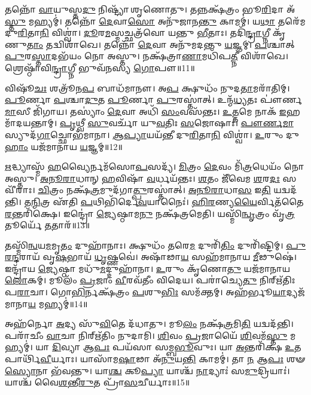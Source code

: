 𑌤𑌨𑍍𑌨𑍋᳴ \ul{𑌵𑌾}\-𑌯𑍁𑌸𑍍𑌤\-\ul{𑌦𑍁} 𑌨𑌿𑌷𑍍𑌟𑍍𑌯𑌾᳴ 𑌶𑍃𑌣𑍋𑌤𑍁।
𑌤𑌨𑍍𑌨𑌕𑍍𑌷᳴𑌤𑍍𑌰𑌂 𑌭𑍂\-\ul{𑌰𑌿}\-𑌦𑌾 𑌅᳴\-\ul{𑌸𑍍𑌤𑍁} 𑌮𑌹𑍍𑌯𑌮𑍍॑।
𑌤𑌨𑍍𑌨𑍋᳴ \ul{𑌦𑍇}\-𑌵𑌾\-\ul{𑌸𑍋} 𑌅𑌨𑍁᳴𑌜𑌾𑌨\-\ul{𑌨𑍍𑌤𑍁} 𑌕𑌾𑌮𑌮𑍍॑।
𑌯\-\ul{𑌥𑌾} 𑌤𑌰𑍇᳴𑌮 𑌦𑍁\-\ul{𑌰𑌿}\-𑌤𑌾\-\ul{𑌨𑌿} 𑌵𑌿𑌶𑍍𑌵𑌾॑।
\-\ul{𑌦𑍂}\-𑌰\-\ul{𑌮}\-𑌸𑍍𑌮𑌚𑍍𑌛𑌤𑍍𑌰᳴𑌵𑍋 𑌯𑌨𑍍𑌤𑍁 \ul{𑌭𑍀}\-𑌤𑌾𑌃।
𑌤𑌦𑌿᳴\-\ul{𑌨𑍍𑌦𑍍𑌰𑌾}\-𑌗𑍍𑌨𑍀 𑌕𑍃᳴𑌣𑍁\-\ul{𑌤𑌾𑌂} 𑌤𑌦𑍍𑌵𑌿𑌶𑌾᳴𑌖𑍇।
𑌤𑌨𑍍𑌨𑍋᳴ \ul{𑌦𑍇}\-𑌵𑌾 𑌅𑌨𑍁᳴𑌮𑌦𑌨𑍍𑌤𑍁 \ul{𑌯}\-𑌜𑍍𑌞𑌮𑍍।
\-\ul{𑌪}\-𑌶𑍍𑌚𑌾𑌤𑍍 \ul{𑌪𑍁}\-𑌰\-\ul{𑌸𑍍𑌤𑌾}\-𑌦𑌭᳴𑌯𑌂 𑌨𑍋 𑌅𑌸𑍍𑌤𑍁।
𑌨𑌕𑍍𑌷᳴𑌤𑍍𑌰𑌾\-\ul{𑌣𑌾}\-𑌮𑌧𑌿᳴𑌪\-\ul{𑌤𑍍𑌨𑍀} 𑌵𑌿𑌶𑌾᳴𑌖𑍇।
𑌶𑍍𑌰𑍇𑌷𑍍𑌠𑌾᳴𑌵𑌿\-\ul{𑌨𑍍𑌦𑍍𑌰𑌾}\-𑌗𑍍𑌨𑍀 𑌭𑍁𑌵᳴𑌨𑌸𑍍𑌯 \ul{𑌗𑍋}\-𑌪𑍗॥11॥

𑌵𑌿𑌷𑍂᳴\-\ul{𑌚𑌃} 𑌶𑌤𑍍𑌰𑍂᳴𑌨\-\ul{𑌪} 𑌬𑌾𑌧᳴𑌮𑌾𑌨𑍗।
𑌅\-\ul{𑌪} 𑌕𑍍𑌷𑍁𑌧𑌂᳴ 𑌨𑍁𑌦\-\ul{𑌤𑌾}\-𑌮𑌰𑌾᳴𑌤𑌿𑌮𑍍।
\-\ul{𑌪𑍂}\-𑌰𑍍𑌣𑌾 \ul{𑌪}\-𑌶𑍍𑌚𑌾\-\ul{𑌦𑍁}\-𑌤 \ul{𑌪𑍂}\-𑌰𑍍𑌣𑌾 \ul{𑌪𑍁}\-𑌰𑌸𑍍𑌤𑌾॑𑌤𑍍।
𑌉𑌨𑍍𑌮᳴\-\ul{𑌧𑍍𑌯}\-𑌤𑌃 𑌪𑍗॑𑌰𑍍𑌣\-\ul{𑌮𑌾}\-𑌸𑍀 𑌜𑌿᳴𑌗𑌾𑌯।
𑌤𑌸𑍍𑌯𑌾𑌂॑ \ul{𑌦𑍇}\-𑌵𑌾 𑌅𑌧𑌿᳴ \ul{𑌸𑌂}\-𑌵𑌸᳴𑌨𑍍𑌤𑌃।
\-\ul{𑌉}\-\-\ul{𑌤𑍍𑌤}\-𑌮𑍇 𑌨𑌾𑌕᳴ \ul{𑌇}\-𑌹 𑌮𑌾᳴𑌦𑌯𑌨𑍍𑌤𑌾𑌮𑍍।
\-\ul{𑌪𑍃}\-𑌥𑍍𑌵𑍀 \ul{𑌸𑍁}\-𑌵𑌰𑍍𑌚𑌾᳴ 𑌯𑍁\-\ul{𑌵}\-𑌤𑌿𑌃 \ul{𑌸}\-𑌜𑍋𑌷𑌾𑌃॑।
\-\ul{𑌪𑍗}\-\-\ul{𑌰𑍍𑌣}\-\-\ul{𑌮𑌾}\-𑌸𑍍𑌯𑍁𑌦᳴\-\ul{𑌗𑌾}\-𑌚𑍍𑌛𑍋𑌭᳴𑌮𑌾𑌨𑌾।
\-\ul{𑌆}\-\-\ul{𑌪𑍍𑌯𑌾}\-𑌯𑌯᳴𑌨𑍍𑌤𑍀 𑌦𑍁\-\ul{𑌰𑌿}\-𑌤𑌾\-\ul{𑌨𑌿} 𑌵𑌿𑌶𑍍𑌵𑌾॑।
\-\ul{𑌉}\-𑌰𑍁𑌂 𑌦𑍁\-\ul{𑌹𑌾𑌂} 𑌯𑌜᳴𑌮𑌾𑌨𑌾𑌯 \ul{𑌯}\-𑌜𑍍𑌞𑌮𑍍॥12॥\anuvakamend[\-\ul{𑌚𑌿}\-𑌤𑍍𑌰𑌭𑌾᳴\-\ul{𑌨𑍁}\-𑌰𑍍𑌯𑌜᳴𑌮𑌾𑌨𑍇 𑌦𑌧𑌾𑌤𑍁 \ul{𑌹}\-𑌵𑌿\-\ul{𑌰𑍍𑌨𑌃} 𑌪𑌾\-\ul{𑌥}\-𑌶𑍍𑌚𑍇𑌤𑍋᳴ 𑌜𑍁𑌷\-\ul{𑌨𑍍𑌤𑌾}\-𑌞𑍍𑌚𑍇𑌤𑍋᳴ 𑌮𑌦𑍇\-\ul{𑌮} 𑌰𑍋𑌚᳴𑌮𑌾\-\ul{𑌨𑌾}\-𑌮𑌰𑌾᳴𑌤𑍀\-\ul{𑌰𑍍𑌗𑍋}\-𑌪𑍗 \ul{𑌯}\-𑌜𑍍𑌞𑌮𑍍]

\-\ul{𑌋}\-𑌦𑍍𑌧𑍍𑌯𑌾𑌸𑍍𑌮᳴ \ul{𑌹}\-𑌵𑍍𑌯𑍈𑌰𑍍𑌨𑌮᳴𑌸𑍋\-\ul{𑌪}\-𑌸𑌦𑍍𑌯᳴।
\-\ul{𑌮𑌿}\-𑌤𑍍𑌰𑌂 \ul{𑌦𑍇}\-𑌵𑌂 𑌮𑌿᳴\-\ul{𑌤𑍍𑌰}\-𑌧𑍇𑌯𑌂᳴ 𑌨𑍋 𑌅𑌸𑍍𑌤𑍁।
\-\ul{𑌅}\-\-\ul{𑌨𑍂}\-\-\ul{𑌰𑌾}\-𑌧𑌾𑌨𑍍 \ul{𑌹}\-𑌵𑌿𑌷𑌾᳴ \ul{𑌵}\-𑌰𑍍𑌧𑌯᳴𑌨𑍍𑌤𑌃।
\-\ul{𑌶}\-𑌤𑌂 𑌜𑍀᳴𑌵𑍇𑌮 \ul{𑌶}\-𑌰\-\ul{𑌦𑌃} 𑌸𑌵𑍀᳴𑌰𑌾𑌃।
\-\ul{𑌚𑌿}\-𑌤𑍍𑌰𑌂 𑌨𑌕𑍍𑌷᳴\-\ul{𑌤𑍍𑌰}\-𑌮𑍁𑌦᳴𑌗𑌾\-\ul{𑌤𑍍𑌪𑍁}\-𑌰𑌸𑍍𑌤𑌾॑𑌤𑍍।
\-\ul{𑌅}\-\-\ul{𑌨𑍂}\-\-\ul{𑌰𑌾}\-𑌧𑌾\-\ul{𑌸} 𑌇\-\ul{𑌤𑌿} 𑌯𑌦𑍍𑌵𑌦᳴𑌨𑍍𑌤𑌿।
𑌤\-\ul{𑌨𑍍𑌮𑌿}\-𑌤𑍍𑌰 𑌏᳴𑌤𑌿 \ul{𑌪}\-𑌥𑌿𑌭𑌿᳴𑌰𑍍𑌦𑍇\-\ul{𑌵}\-𑌯𑌾𑌨𑍈𑌃॑।
\-\ul{𑌹𑌿}\-\-\ul{𑌰}\-𑌣𑍍𑌯\-\ul{𑌯𑍈}\-𑌰𑍍𑌵𑌿𑌤᳴𑌤𑍈\-\-\ul{𑌰}\-𑌨𑍍𑌤𑌰𑌿᳴𑌕𑍍𑌷𑍇।
𑌇𑌨𑍍𑌦𑍍𑌰𑍋॑ \ul{𑌜𑍍𑌯𑍇}\-𑌷𑍍𑌠𑌾𑌮\-\ul{𑌨𑍁} 𑌨𑌕𑍍𑌷᳴𑌤𑍍𑌰𑌮𑍇𑌤𑌿।
𑌯𑌸𑍍𑌮𑌿᳴\-\ul{𑌨𑍍𑌵𑍃}\-𑌤𑍍𑌰𑌂 𑌵𑍃᳴\-\ul{𑌤𑍍𑌰}\-𑌤𑍂𑌰𑍍𑌯𑍇᳴ \ul{𑌤}\-𑌤𑌾𑌰᳴॥13॥

𑌤𑌸𑍍𑌮𑌿᳴\-\ul{𑌨𑍍𑌵}\-𑌯\-\ul{𑌮}\-𑌮𑍃\-\ul{𑌤𑌂} 𑌦𑍁𑌹𑌾᳴𑌨𑌾𑌃।
𑌕𑍍𑌷𑍁𑌧𑌂᳴ 𑌤𑌰𑍇\-\ul{𑌮} 𑌦𑍁𑌰𑌿᳴\-\ul{𑌤𑌿𑌂} 𑌦𑍁𑌰𑌿᳴𑌷𑍍𑌟𑌿𑌮𑍍।
\-\ul{𑌪𑍁}\-\-\ul{𑌰}\-\-\ul{𑌨𑍍𑌦}\-𑌰𑌾𑌯᳴ 𑌵𑍃\-\ul{𑌷}\-𑌭𑌾𑌯᳴ \ul{𑌧𑍃}\-𑌷𑍍𑌣𑌵𑍇॑।
𑌅𑌷𑌾᳴𑌢𑌾\-\ul{𑌯} 𑌸𑌹᳴𑌮𑌾𑌨𑌾𑌯 \ul{𑌮𑍀}\-𑌢𑍁𑌷𑍇॑।
𑌇𑌨𑍍𑌦𑍍𑌰𑌾᳴𑌯 \ul{𑌜𑍍𑌯𑍇}\-𑌷𑍍𑌠𑌾 𑌮𑌧𑍁᳴\-\ul{𑌮}\-𑌦𑍍𑌦𑍁𑌹𑌾᳴𑌨𑌾।
\-\ul{𑌉}\-𑌰𑍁𑌂 𑌕𑍃᳴𑌣𑍋\-\ul{𑌤𑍁} 𑌯𑌜᳴𑌮𑌾𑌨𑌾𑌯 \ul{𑌲𑍋}\-𑌕𑌮𑍍।
𑌮𑍂𑌲𑌂᳴ \ul{𑌪𑍍𑌰}\-𑌜𑌾𑌂 \ul{𑌵𑍀}\-𑌰𑌵᳴𑌤𑍀𑌂 𑌵𑌿𑌦𑍇𑌯।
𑌪𑌰𑌾॑𑌚𑍍𑌯𑍇\-\ul{𑌤𑍁} 𑌨𑌿𑌰𑍍\mbox{}𑌋᳴𑌤𑌿𑌃 𑌪\-\ul{𑌰𑌾}\-𑌚𑌾।
𑌗𑍋\-\ul{𑌭𑌿}\-𑌰𑍍𑌨𑌕𑍍𑌷᳴𑌤𑍍𑌰𑌂 \ul{𑌪}\-𑌶𑍁\-\ul{𑌭𑌿𑌃} 𑌸𑌮᳴𑌕𑍍𑌤𑌮𑍍।
𑌅𑌹᳴𑌰𑍍𑌭𑍂\-\ul{𑌯𑌾}\-𑌦𑍍𑌯𑌜᳴𑌮𑌾𑌨𑌾\-\ul{𑌯} 𑌮𑌹𑍍𑌯𑌮𑍍॑॥14॥

𑌅𑌹᳴𑌰𑍍𑌨𑍋 \ul{𑌅}\-𑌦𑍍𑌯 𑌸𑍁᳴\-\ul{𑌵𑌿}\-𑌤𑍇 𑌦᳴𑌧𑌾𑌤𑍁।
𑌮𑍂\-\ul{𑌲𑌂} 𑌨𑌕𑍍𑌷᳴\-\ul{𑌤𑍍𑌰}\-𑌮𑌿\-\ul{𑌤𑌿} 𑌯𑌦𑍍𑌵𑌦᳴𑌨𑍍𑌤𑌿।
𑌪𑌰𑌾᳴𑌚𑍀𑌂 \ul{𑌵𑌾}\-𑌚𑌾 𑌨𑌿𑌰𑍍\mbox{}𑌋᳴𑌤𑌿𑌂 𑌨𑍁𑌦𑌾𑌮𑌿।
\-\ul{𑌶𑌿}\-𑌵𑌂 \ul{𑌪𑍍𑌰}\-𑌜𑌾𑌯𑍈᳴ \ul{𑌶𑌿}\-𑌵𑌮᳴\-\ul{𑌸𑍍𑌤𑍁} 𑌮𑌹𑍍𑌯𑌮𑍍॑।
𑌯𑌾 \ul{𑌦𑌿}\-𑌵𑍍𑌯𑌾 𑌆\-\ul{𑌪𑌃} 𑌪𑌯᳴𑌸𑌾 𑌸𑌮𑍍𑌬\-\ul{𑌭𑍂}\-𑌵𑍁𑌃।
𑌯𑌾 \ul{𑌅}\-𑌨𑍍𑌤𑌰𑌿᳴𑌕𑍍𑌷 \ul{𑌉}\-𑌤 𑌪𑌾𑌰𑍍𑌥𑌿᳴\-\ul{𑌵𑍀}\-𑌰𑍍𑌯𑌾𑌃।
𑌯𑌾𑌸𑌾᳴𑌮\-\ul{𑌷𑌾}\-𑌢𑌾 𑌅᳴\-\ul{𑌨𑍁}\-𑌯\-\ul{𑌨𑍍𑌤𑌿} 𑌕𑌾𑌮𑌮𑍍॑।
𑌤𑌾 \ul{𑌨} 𑌆\-\ul{𑌪𑌃} 𑌶𑍟 \ul{𑌸𑍍𑌯𑍋}\-𑌨𑌾 𑌭᳴𑌵𑌨𑍍𑌤𑍁।
𑌯𑌾\-\ul{𑌶𑍍𑌚} 𑌕𑍂\-\ul{𑌪𑍍𑌯𑌾} 𑌯𑌾𑌶𑍍𑌚᳴ \ul{𑌨𑌾}\-𑌦𑍍𑌯𑌾𑌃॑ 𑌸\-\ul{𑌮𑍁}\-𑌦𑍍𑌰𑌿𑌯𑌾𑌃॑।
𑌯𑌾𑌶𑍍𑌚᳴ 𑌵𑍈\-\ul{𑌶}\-𑌨𑍍𑌤𑍀\-\ul{𑌰𑍁}\-𑌤 𑌪𑍍𑌰𑌾᳴\-\ul{𑌸}\-𑌚𑍀𑌰𑍍𑌯𑌾𑌃॥15॥

